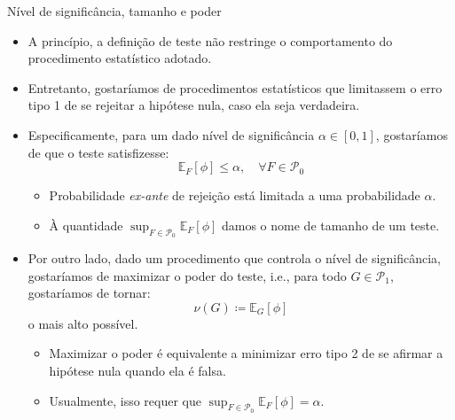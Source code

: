 \documentclass[11pt]{beamer}
\begin{document}
\begin{frame}{Nível de significância, tamanho e poder }
\begin{itemize}
	\item A princípio, a definição de teste não restringe o comportamento do procedimento estatístico adotado.
	\item Entretanto, gostaríamos de procedimentos estatísticos que limitassem o {\color{blue}erro tipo 1} de se rejeitar a hipótese nula, caso ela seja verdadeira.
	\item Especificamente, para um dado {\color{blue}nível de significância} $\alpha \in [0,1]$, gostaríamos de que o teste satisfizesse:
	$$\mathbb{E}_F[\phi] \leq \alpha,\quad \forall F \in \mathcal{P}_0$$
	\vspace{-1em}
	\begin{itemize}
		\item Probabilidade \textit{ex-ante} de rejeição está limitada a uma probabilidade $\alpha$.
		\item À quantidade $\sup_{F \in \mathcal{P}_0} \mathbb{E}_F[\phi]$ damos o nome de {\color{blue}tamanho} de um teste.
	\end{itemize}
	\item Por outro lado, dado um procedimento que controla o nível de significância, gostaríamos de maximizar {\color{blue}o poder do teste}, i.e., para todo $G \in \mathcal{P}_1$, gostaríamos de tornar:
	$$\nu(G)\coloneqq \mathbb{E}_G[\phi]$$
	o mais alto possível.
	\begin{itemize}
		\item Maximizar o poder é equivalente a minimizar {\color{blue}erro tipo 2} de se afirmar a hipótese nula quando ela é falsa.
		\item Usualmente, isso requer que $\sup_{F \in \mathcal{P}_0} \mathbb{E}_F[\phi] = \alpha$.
	\end{itemize}
\end{itemize}
\end{frame}
\end{document}
